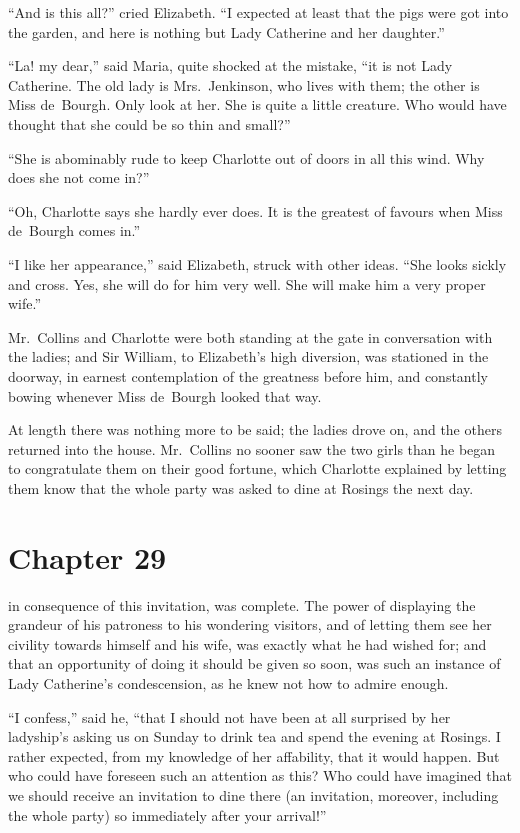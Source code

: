 ``And is this all?'' cried Elizabeth.  ``I expected at least that the
pigs were got into the garden, and here is nothing but Lady
Catherine and her daughter.''

``La! my dear,'' said Maria, quite shocked at the mistake, ``it is
not Lady Catherine.  The old lady is Mrs.\ Jenkinson, who lives
with them; the other is Miss de~Bourgh.  Only look at her.  She
is quite a little creature.  Who would have thought that she could
be so thin and small?''

``She is abominably rude to keep Charlotte out of doors in all this
wind.  Why does she not come in?''

``Oh, Charlotte says she hardly ever does.  It is the greatest of
favours when Miss de~Bourgh comes in.''

``I like her appearance,'' said Elizabeth, struck with other ideas.
``She looks sickly and cross.  Yes, she will do for him very well.
She will make him a very proper wife.''

Mr.\ Collins and Charlotte were both standing at the gate in
conversation with the ladies; and Sir William, to Elizabeth's
high diversion, was stationed in the doorway, in earnest
contemplation of the greatness before him, and constantly
bowing whenever Miss de~Bourgh looked that way.

At length there was nothing more to be said; the ladies drove on,
and the others returned into the house.  Mr.\ Collins no sooner
saw the two girls than he began to congratulate them on their
good fortune, which Charlotte explained by letting them know
that the whole party was asked to dine at Rosings the next day.



\chapter{Chapter 29}


 in consequence of this invitation, was
complete.  The power of displaying the grandeur of his patroness
to his wondering visitors, and of letting them see her civility
towards himself and his wife, was exactly what he had wished
for; and that an opportunity of doing it should be given so soon,
was such an instance of Lady Catherine's condescension, as he
knew not how to admire enough.

``I confess,'' said he, ``that I should not have been at all surprised
by her ladyship's asking us on Sunday to drink tea and spend the
evening at Rosings.  I rather expected, from my knowledge of
her affability, that it would happen.  But who could have
foreseen such an attention as this?  Who could have imagined
that we should receive an invitation to dine there (an invitation,
moreover, including the whole party) so immediately after your
arrival!''

